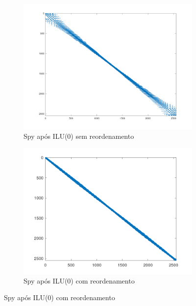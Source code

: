 \begin{figure}[H]
    \centering
    \begin{subfigure}[t]{0.4\linewidth}
         \centering
         \includegraphics[width=\textwidth]{images/cz2548_spyM_ILU(0)_sem.png}
         \caption{Spy após ILU(0) sem reordenamento}
         \label{fig:cz-ILU0-sem}
    \end{subfigure}
    \quad
    \begin{subfigure}[t]{0.4\linewidth}
         \centering
         \includegraphics[width=\textwidth]{images/cz2548_spyM_ILU(0)_com.png}
         \caption{Spy após ILU(0) com reordenamento}
         \label{fig:cz-ILU0-com}
    \end{subfigure}
    \par\bigskip

\end{figure}
